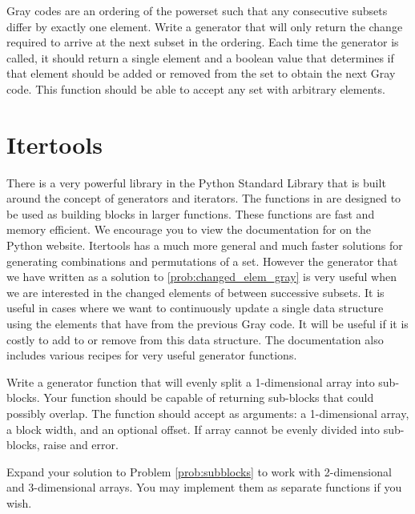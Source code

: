\begin{problem}
\label{prob:changed_elem_gray}
Gray codes are an ordering of the powerset such that any consecutive subsets differ by exactly one element.  Write a generator that will only return the change required to arrive at the next subset in the ordering.  Each time the generator is called, 
it should return a single element and a boolean value that determines if that element should be
added or removed from the set to obtain the next Gray code.  This function should be able to accept any set with arbitrary elements.
\end{problem}

\section*{Itertools}
There is a very powerful library in the Python Standard Library that is built around the concept
of generators and iterators.  The functions in  are designed to be used as
building blocks in larger functions.  These functions are fast and memory efficient.
We encourage you to view the documentation for  on the Python website.  Itertools has a much more general and much faster solutions for generating combinations and permutations of a set.  However the generator that we have written as a solution to \ref{prob:changed_elem_gray} is very useful when we are interested in the changed elements of between successive subsets.  It is useful in cases where we want to continuously update a single data structure using the elements that have from the previous Gray code.  It will be useful if it is costly to add to or remove from this data structure.
The documentation also includes various recipes for very useful generator functions.

\begin{problem}
\label{prob:subblocks}
Write a generator function that will evenly split a 1-dimensional array into sub-blocks.
Your function should be capable of returning sub-blocks that could possibly overlap.
The function should accept as arguments: a 1-dimensional array,
a block width, and an optional offset.  If array cannot be evenly divided into
sub-blocks, raise and error.
\end{problem}

\begin{problem}
Expand your solution to Problem \ref{prob:subblocks} to work with 2-dimensional and 3-dimensional
arrays.  You may implement them as separate functions if you wish.
\end{problem}

\printbibliography

% 

